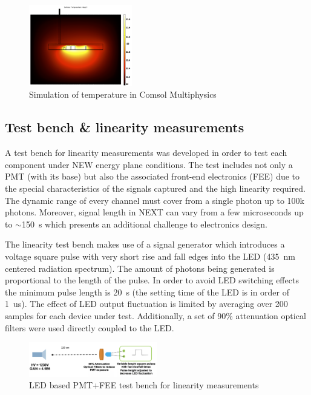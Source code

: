 \documentclass[a4paper, 10pt, oneside, twocolumn, 3p]{elsarticle}
\begin{document}
 
\begin{figure}
  \begin{center}
    \includegraphics[width=0.4\textwidth]{./figures/temp_simulation.png}
    \caption{Simulation of temperature in Comsol Multiphysics}
    \label{fig:temp_simu}
  \end{center}
\end{figure}

\subsection {Test bench \& linearity measurements}

\par A test bench for linearity measurements was developed in order to test each component under NEW energy plane conditions. The test includes not only a PMT (with its base) but also the associated front-end electronics (FEE) due to the special characteristics of the signals captured and the high linearity required.  The dynamic range of every channel must cover from a single photon up to 100k photons. Moreover, signal length in NEXT can vary from a few microseconds up to $\sim$150~\textmu s which presents an additional challenge to electronics design.

\par The linearity test bench makes use of a signal generator which introduces a voltage square pulse with very short rise and fall edges into the LED (435~nm centered radiation spectrum). The amount of photons being generated is proportional to the length of the pulse. In order to avoid LED switching effects the minimum pulse length is 20~\textmu s (the setting time of the LED is in order of 1~us). The effect of LED output fluctuation is limited by averaging over 200 samples for each device under test. Additionally, a set of 90\% attenuation optical filters were used directly coupled to the LED.

\begin{figure}[H]
	\begin{center}
		\includegraphics[width=0.5\textwidth]{./figures/LED_testbench1.png}
		\caption{LED based PMT+FEE test bench for linearity measurements}
		\label{fig:LED_testbench}
	\end{center}
\end{figure}
\end{document}
